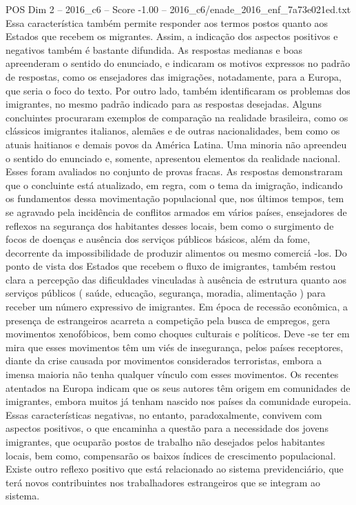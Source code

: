 \begin{textsample}{POS Dim 2 – 2016\_c6 – Score -1.00 – 2016\_c6/enade\_2016\_enf\_7a73e021ed.txt}
Essa característica também permite responder aos termos postos quanto aos Estados que recebem os migrantes.
Assim, a indicação dos aspectos positivos e negativos também é bastante difundida.
As respostas medianas e boas apreenderam o sentido do enunciado, e indicaram os motivos expressos no padrão de respostas, como os ensejadores das imigrações, notadamente, para a Europa, que seria o foco do texto.
Por outro lado, também identificaram os problemas dos imigrantes, no mesmo padrão indicado para as respostas desejadas.
Alguns concluintes procuraram exemplos de comparação na realidade brasileira, como os clássicos imigrantes italianos, alemães e de outras nacionalidades, bem como os atuais haitianos e demais povos da América Latina.
Uma minoria não apreendeu o sentido do enunciado e, somente, apresentou elementos da realidade nacional.
Esses foram avaliados no conjunto de provas fracas.
As respostas demonstraram que o concluinte está atualizado, em regra, com o tema da imigração, indicando os fundamentos dessa movimentação populacional que, nos últimos tempos, tem se agravado pela incidência de conflitos armados em vários países, ensejadores de reflexos na segurança dos habitantes desses locais, bem como o surgimento de focos de doenças e ausência dos serviços públicos básicos, além da fome, decorrente da impossibilidade de produzir alimentos ou mesmo comerciá -los.
Do ponto de vista dos Estados que recebem o fluxo de imigrantes, também restou clara a percepção das dificuldades vinculadas à ausência de estrutura quanto aos serviços públicos ( saúde, educação, segurança, moradia, alimentação ) para receber um número expressivo de imigrantes.
Em época de recessão econômica, a presença de estrangeiros acarreta a competição pela busca de empregos, gera movimentos xenofóbicos, bem como choques culturais e políticos.
Deve -se ter em mira que esses movimentos têm um viés de insegurança, pelos países receptores, diante da crise causada por movimentos considerados terroristas, embora a imensa maioria não tenha qualquer vínculo com esses movimentos.
Os recentes atentados na Europa indicam que os seus autores têm origem em comunidades de imigrantes, embora muitos já tenham nascido nos países da comunidade europeia.
Essas características negativas, no entanto, paradoxalmente, convivem com aspectos positivos, o que encaminha a questão para a necessidade dos jovens imigrantes, que ocuparão postos de trabalho não desejados pelos habitantes locais, bem como, compensarão os baixos índices de crescimento populacional.
Existe outro reflexo positivo que está relacionado ao sistema previdenciário, que terá novos contribuintes nos trabalhadores estrangeiros que se integram ao sistema.

\end{textsample}
